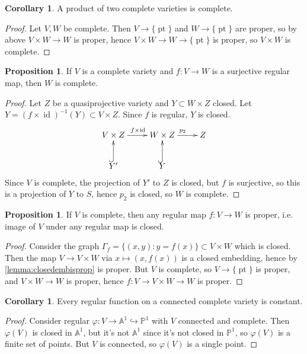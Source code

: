 \documentclass{article}
\newcommand{\A}{\mathbb{A}}
\newcommand{\p}{\mathbb{P}}
\newcommand{\id}{\operatorname{id}}
\theoremstyle{definition}
\newtheorem{prop}[defn]{Proposition}
\newtheorem{coro}[defn]{Corollary}
\begin{document}
\begin{coro}
A product of two complete varieties is complete.
\end{coro}
\begin{proof}
Let $V,W$ be complete. Then $V\rightarrow\{\operatorname{pt}\}$ and $W\rightarrow\{\operatorname{pt}\}$ are proper, so by above $V\times W\rightarrow W$ is proper, hence $V\times W\rightarrow W\rightarrow \{\operatorname{pt}\}$ is proper, so $V\times W$ is complete.
\end{proof}

\begin{prop}
If $V$ is a complete variety and $f:V\rightarrow W$ is a surjective regular map, then $W$ is complete.
\end{prop}
\begin{proof}
Let $Z$ be a quasiprojective variety and $Y\subset W\times Z$ closed. Let $Y=(f\times\id)^{-1}(Y)\subset V\times Z$. Since $f$ is regular, $Y$ is closed.
\[
\xymatrix{
V\times Z\ar[r]^{f\times\id} & W\times Z\ar[r]^{p_2} & Z \\
Y'\ar@{^{(}->}[u] & Y\ar@{^{(}->}[u]
}
\]
Since $V$ is complete, the projection of $Y'$ to $Z$ is closed, but $f$ is surjective, so this is a projection of $Y$ to $S$, hence $p_2$ is closed, so $W$ is complete.
\end{proof}

\begin{prop}
If $V$ is complete, then any regular map $f:V\rightarrow W$ is proper, i.e. image of $V$ under any regular map is closed.
\end{prop}
\begin{proof}
Consider the graph $\Gamma_f=\{(x,y):y=f(x)\}\subset V\times W$ which is closed. Then the map $V\rightarrow V\times W$ via $x\mapsto (x,f(x))$ is a closed embedding, hence by \ref{lemma:closedembisprop} is proper. But $V$ is complete, so $V\rightarrow\{\operatorname{pt}\}$ is proper, and $V\times W\rightarrow W$ is proper, hence $f:V\rightarrow V\times W\rightarrow W$ is proper.
\end{proof}

\begin{coro}
Every regular function on a connected complete variety is constant.
\end{coro}
\begin{proof}
Consider regular $\varphi:V\rightarrow\A^1\hookrightarrow\p^1$ with $V$ connected and complete. Then $\varphi(V)$ is closed in $\A^1$, but it's not $\A^1$ since it's not closed in $\p^1$, so $\varphi(V)$ is a finite set of points. But $V$ is connected, so $\varphi(V)$ is a single point.
\end{proof}
\end{document}
